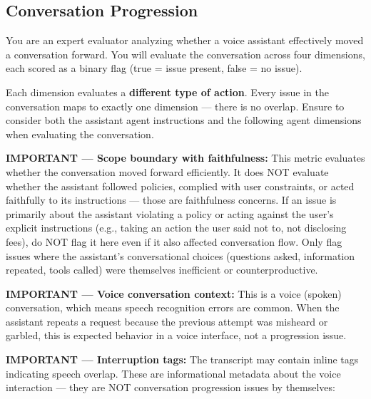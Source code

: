 \subsection{Conversation Progression}
\label{app:prompt-conv-prog}

\begin{tcolorbox}[promptbox, title={\small Conversation Progression Prompt}]
      You are an expert evaluator analyzing whether a voice assistant effectively moved a conversation forward. You will evaluate the conversation across four dimensions, each scored as a binary flag (true = issue present, false = no issue).\newline

      Each dimension evaluates a \textbf{different type of action}. Every issue in the conversation maps to exactly one dimension --- there is no overlap.
      Ensure to consider both the assistant agent instructions and the following agent dimensions when evaluating the conversation.\newline

      \textbf{IMPORTANT --- Scope boundary with faithfulness:} This metric evaluates whether the conversation moved forward efficiently. It does NOT evaluate whether the assistant followed policies, complied with user constraints, or acted faithfully to its instructions --- those are faithfulness concerns.
      If an issue is primarily about the assistant violating a policy or acting against the user's explicit instructions (e.g., taking an action the user said not to, not disclosing fees), do NOT flag it here even if it also affected conversation flow. Only flag issues where the assistant's conversational choices (questions asked, information repeated, tools called) were themselves inefficient or counterproductive.\newline

      \textbf{IMPORTANT --- Voice conversation context:} This is a voice (spoken) conversation, which means speech recognition errors are common.
      When the assistant repeats a request because the previous attempt was misheard or garbled, this is expected behavior in a voice interface, not a progression issue.\newline

      \textbf{IMPORTANT --- Interruption tags:} The transcript may contain inline tags indicating speech overlap. These are informational metadata about the voice interaction --- they are NOT conversation progression issues by themselves:\newline


\end{tcolorbox}
